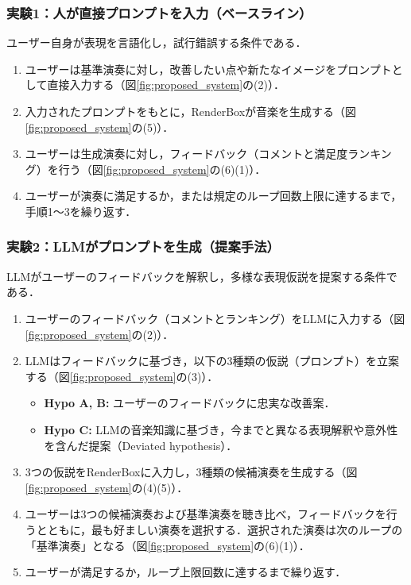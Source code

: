 \subsubsection*{実験1：人が直接プロンプトを入力（ベースライン）}
ユーザー自身が表現を言語化し，試行錯誤する条件である．
\begin{enumerate}
    \item ユーザーは基準演奏に対し，改善したい点や新たなイメージをプロンプトとして直接入力する（図\ref{fig:proposed_system}の(2)）．
    \item 入力されたプロンプトをもとに，RenderBoxが音楽を生成する（図\ref{fig:proposed_system}の(5)）．
    \item ユーザーは生成演奏に対し，フィードバック（コメントと満足度ランキング）を行う（図\ref{fig:proposed_system}の(6)(1)）．
    \item ユーザーが演奏に満足するか，または規定のループ回数上限に達するまで，手順1〜3を繰り返す．
\end{enumerate}

\subsubsection*{実験2：LLMがプロンプトを生成（提案手法）}
LLMがユーザーのフィードバックを解釈し，多様な表現仮説を提案する条件である．
\begin{enumerate}
    \item ユーザーのフィードバック（コメントとランキング）をLLMに入力する（図\ref{fig:proposed_system}の(2)）．
    \item LLMはフィードバックに基づき，以下の3種類の仮説（プロンプト）を立案する（図\ref{fig:proposed_system}の(3)）．
    \begin{itemize}
        \item \textbf{Hypo A, B:} ユーザーのフィードバックに忠実な改善案．
        \item \textbf{Hypo C:} LLMの音楽知識に基づき，今までと異なる表現解釈や意外性を含んだ提案（Deviated hypothesis）．
    \end{itemize}
    \item 3つの仮説をRenderBoxに入力し，3種類の候補演奏を生成する（図\ref{fig:proposed_system}の(4)(5)）．
    \item ユーザーは3つの候補演奏および基準演奏を聴き比べ，フィードバックを行うとともに，最も好ましい演奏を選択する．選択された演奏は次のループの「基準演奏」となる（図\ref{fig:proposed_system}の(6)(1)）．
    \item ユーザーが満足するか，ループ上限回数に達するまで繰り返す．
\end{enumerate}

